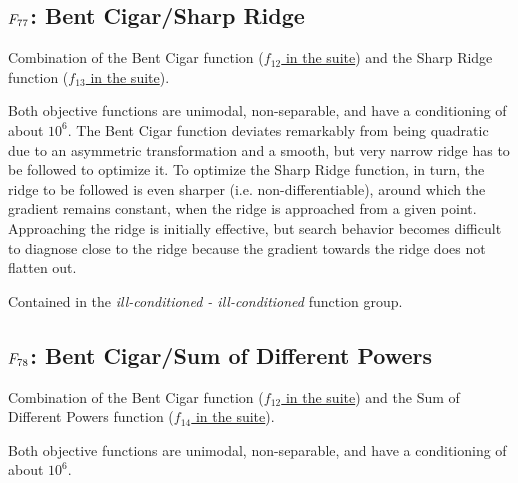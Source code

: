 \subsection[\texorpdfstring{\protect\(F_{77}\protect\): Bent Cigar/Sharp Ridge}{F77: Bent Cigar/Sharp Ridge}]{\texorpdfstring{\protect\(F_{77}\protect\): Bent Cigar/Sharp Ridge}{}}
\label{index:bent-cigar-sharp-ridge}\label{index:f77}
Combination of the Bent Cigar function (\href{https://coco.gforge.inria.fr/downloads/download16.00/bbobdocfunctions.pdf\#page=60}{\(f_{12}\) in the \bbob suite}) and the
Sharp Ridge function (\href{https://coco.gforge.inria.fr/downloads/download16.00/bbobdocfunctions.pdf\#page=65}{\(f_{13}\) in the \bbob suite}).

Both objective functions are unimodal, non-separable, and have a conditioning
of about \(10^6\).
The Bent Cigar function deviates remarkably
from being quadratic due to an asymmetric transformation and a smooth,
but very narrow ridge has to be followed to optimize it.
To optimize the Sharp Ridge function, in turn, the ridge to be followed
is even sharper (i.e. non-differentiable), around which the gradient remains
constant, when the ridge is approached from a given point. Approaching the ridge is
initially effective, but search behavior becomes difficult to diagnose
close to the ridge because the gradient towards the ridge does not flatten out.

Contained in the \emph{ill-conditioned - ill-conditioned} function group.



\subsection[\texorpdfstring{\protect\(F_{78}\protect\): Bent Cigar/Sum of Different Powers}{F78: Bent Cigar/Sum of Different Powers}]{\texorpdfstring{\protect\(F_{78}\protect\): Bent Cigar/Sum of Different Powers}{}}
\label{index:f78}\label{index:bent-cigar-sum-of-different-powers}
Combination of the Bent Cigar function (\href{https://coco.gforge.inria.fr/downloads/download16.00/bbobdocfunctions.pdf\#page=60}{\(f_{12}\) in the \bbob suite}) and the
Sum of Different Powers function (\href{https://coco.gforge.inria.fr/downloads/download16.00/bbobdocfunctions.pdf\#page=70}{\(f_{14}\) in the \bbob suite}).

Both objective functions are unimodal, non-separable, and have a conditioning
of about \(10^6\).

